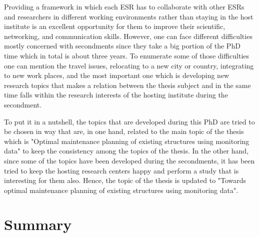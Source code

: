 Providing a framework in which each ESR has to collaborate with other ESRs and researchers in different working environments rather than staying in the host institute is an excellent 
opportunity for them to improve their scientific, networking, and communication skills. However, one can face different difficulties mostly concerned with secondments since they take a big 
portion of the PhD time which in total is about three years. To enumerate some of those difficulties one can mention the travel issues, relocating to a new city or country, integrating to 
new work places, and the most important one which is developing new research topics that makes a relation between the thesis subject and in the same time falls within the research interests 
of the hosting institute during the secondment. 

To put it in a nutshell, the topics that are developed during this PhD are tried to be chosen in way that are, in one hand, related to the main topic of the thesis which is "Optimal 
maintenance planning of existing structures using monitoring data" to keep the consistency among the topics of the thesis. In the other hand, since some of the topics have been developed 
during the secondments, it has been tried to keep the hosting research centers happy and perform a study that is interesting for them also. Hence, the topic of the thesis is updated to 
"Towards optimal maintenance planning of existing structures using monitoring data". 

\section*{Summary}

